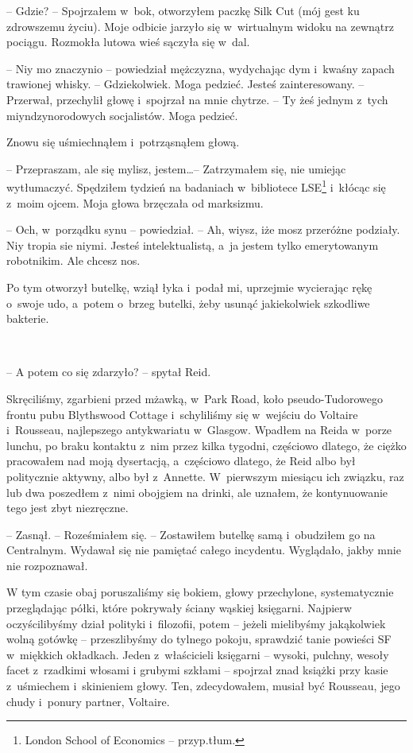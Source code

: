 \documentclass[oneside,polish,11pt,sfheadings]{mwbk}
\begin{document}
-- Gdzie? -- Spojrzałem w~bok, otworzyłem paczkę Silk Cut (mój gest ku
zdrowszemu życiu). Moje odbicie jarzyło się w~wirtualnym widoku na
zewnątrz pociągu. Rozmokła lutowa wieś sączyła się w~dal.

-- Niy mo znaczynio -- powiedział mężczyzna, wydychając dym i~kwaśny
zapach trawionej whisky. -- Gdziekolwiek. Moga pedzieć. Jesteś
zainteresowany. -- Przerwał, przechylił głowę i~spojrzał na mnie chytrze.
-- Ty żeś jednym z~tych miyndzynorodowych socjalistów. Moga pedzieć.

Znowu się uśmiechnąłem i~potrząsnąłem głową. 

-- Przepraszam, ale się
mylisz, jestem\ldots -- Zatrzymałem się, nie umiejąc wytłumaczyć. Spędziłem
tydzień na badaniach w~bibliotece LSE\footnote{London School of Economics  -- przyp.tłum.} i~kłócąc się z~moim ojcem. Moja głowa brzęczała od
marksizmu.

-- Och, w~porządku synu -- powiedział. -- Ah, wiysz, iże mosz przeróżne
podziały. Niy tropia sie niymi. Jesteś intelektualistą, a~ja jestem
tylko emerytowanym robotnikim. Ale chcesz nos.

Po tym otworzył butelkę, wziął łyka i~podał mi, uprzejmie wycierając
rękę o~swoje udo, a~potem o~brzeg butelki, żeby usunąć jakiekolwiek
szkodliwe bakterie.

~

-- A potem co się zdarzyło? -- spytał Reid.

Skręciliśmy, zgarbieni przed mżawką, w~Park Road, koło pseudo-Tudorowego
frontu pubu Blythswood Cottage i~schyliliśmy się w~wejściu do Voltaire i~Rousseau, najlepszego antykwariatu w~Glasgow. Wpadłem na Reida w~porze
lunchu, po braku kontaktu z~nim przez kilka tygodni, częściowo dlatego,
że ciężko pracowałem nad moją dysertacją, a~częściowo dlatego, że Reid
albo był politycznie aktywny, albo był z~Annette. W~pierwszym miesiącu
ich związku, raz lub dwa poszedłem z~nimi obojgiem na drinki, ale
uznałem, że kontynuowanie tego jest zbyt niezręczne.

-- Zasnął. -- Roześmiałem się. -- Zostawiłem butelkę samą i~obudziłem go na
Centralnym. Wydawał się nie pamiętać całego incydentu. Wyglądało, jakby
mnie nie rozpoznawał.

W tym czasie obaj poruszaliśmy się bokiem, głowy przechylone,
systematycznie przeglądając półki, które pokrywały ściany wąskiej
księgarni. Najpierw oczyścilibyśmy dział polityki i~filozofii, potem -- jeżeli mielibyśmy jakąkolwiek wolną gotówkę -- przeszlibyśmy do tylnego
pokoju, sprawdzić tanie powieści SF w~miękkich okładkach. Jeden z~właścicieli księgarni -- wysoki, pulchny, wesoły facet z~rzadkimi włosami
i grubymi szkłami -- spojrzał znad książki przy kasie z~uśmiechem i~skinieniem głowy. Ten, zdecydowałem, musiał być Rousseau, jego chudy i~ponury partner, Voltaire.
\end{document}
